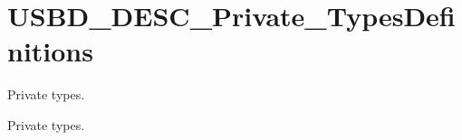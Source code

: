 \hypertarget{group___u_s_b_d___d_e_s_c___private___types_definitions}{
\section{USBD\_\-DESC\_\-Private\_\-TypesDefinitions}
\label{group___u_s_b_d___d_e_s_c___private___types_definitions}
}
Private types.  


Private types. 